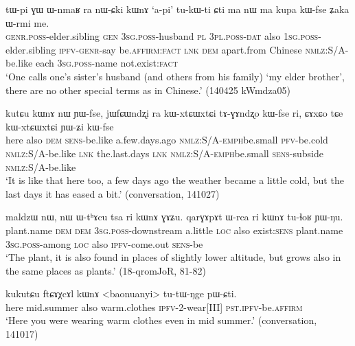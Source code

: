    \begin{exe}
\ex \label{ex:nWCki.kWnA}
\gll  tɯ-pi ɣɯ ɯ-nmaʁ ra nɯ-ɕki kɯnɤ `a-pi' tu-kɯ-ti ɕti ma nɯ ma kupa kɯ-fse ʑaka ɯ-rmi me. \\
\textsc{genr}.\textsc{poss}-elder.sibling \textsc{gen} \textsc{3sg}.\textsc{poss}-husband \textsc{pl} \textsc{3pl}.\textsc{poss}-\textsc{dat} also \textsc{1sg}.\textsc{poss}-elder.sibling \textsc{ipfv}-\textsc{genr}-say be.\textsc{affirm}:\textsc{fact} \textsc{lnk} \textsc{dem} apart.from Chinese \textsc{nmlz}:S/A-be.like each \textsc{3sg}.\textsc{poss}-name not.exist:\textsc{fact} \\
\glt  `One calls one's sister's husband (and others from his family) `my elder brother', there are no other special terms as in Chinese.' (140425 kWmdza05)
\end{exe}


  \begin{exe}
\ex \label{ex:kutCu.kWnA}
\gll  kutɕu kɯnɤ nɯ ɲɯ-fse, jɯfɕɯndʐi ra kɯ-xtɕɯ\redp{}xtɕi tɤ-ɣɤndʐo kɯ-fse ri, ɕɤxɕo tɕe kɯ-xtɕɯ\redp{}xtɕi ɲɯ-ʑi kɯ-fse \\
here also \textsc{dem} \textsc{sens}-be.like a.few.days.ago \textsc{nmlz}:S/A-\textsc{emph}\redp{}be.small \textsc{pfv}-be.cold \textsc{nmlz}:S/A-be.like \textsc{lnk} the.last.days \textsc{lnk} \textsc{nmlz}:S/A-\textsc{emph}\redp{}be.small \textsc{sens}-subside \textsc{nmlz}:S/A-be.like \\
\glt `It is like that here too, a few days ago the weather became a little cold, but the last days it has eased a bit.' (conversation, 141027)
  \end{exe}
  
    \begin{exe}
\ex \label{ex:ri.kWnA}
\gll   maldzɯ nɯ, nɯ ɯ-tʰɤcu tsa ri kɯnɤ ɣɤʑu. qarɣɤpɤt ɯ-rca ri kɯnɤ tu-ɬoʁ ɲɯ-ŋu. \\
plant.name \textsc{dem} \textsc{dem} \textsc{3sg}.\textsc{poss}-downstream a.little \textsc{loc} also exist:\textsc{sens} plant.name \textsc{3sg}.\textsc{poss}-among \textsc{loc} also \textsc{ipfv}-come.out \textsc{sens}-be \\
\glt `The  plant, it is also found in places of slightly lower altitude, but grows also in the same places as   plants.' (18-qromJoR, 81-82)
    \end{exe}
    
\begin{exe}
\ex \label{ex:ftCAXcAl.kWnA}
\gll   kukutɕu ftɕɤχcɤl kɯnɤ <baonuanyi> tu-tɯ-ŋge pɯ-ɕti. \\
  here mid.summer also warm.clothes \textsc{ipfv}-2-wear[III] \textsc{pst}.\textsc{ipfv}-be.\textsc{affirm} \\
  \glt `Here you were wearing warm clothes even in mid summer.' (conversation, 141017)
    \end{exe}
    
